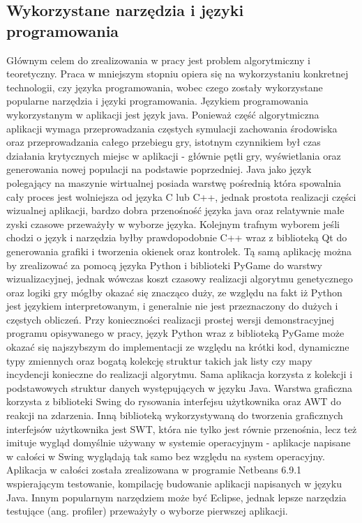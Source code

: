 \subsection{Wykorzystane narzędzia i języki programowania}
\begin{par}
	Głównym celem do zrealizowania w pracy jest problem algorytmiczny i teoretyczny.
Praca w mniejszym stopniu opiera się na wykorzystaniu konkretnej technologii, czy języka programowania, wobec czego zostały wykorzystane popularne narzędzia i języki programowania.
Językiem programowania wykorzystanym w aplikacji jest język java.
Ponieważ część algorytmiczna aplikacji wymaga przeprowadzania częstych symulacji zachowania środowiska oraz przeprowadzania całego przebiegu gry, istotnym czynnikiem był czas działania krytycznych miejsc w aplikacji - głównie pętli gry, wyświetlania oraz generowania nowej populacji na podstawie poprzedniej.
Java jako język polegający na maszynie wirtualnej posiada warstwę pośrednią która spowalnia cały proces jest wolniejsza od języka C lub C++,
jednak prostota realizacji części wizualnej aplikacji, bardzo dobra przenośność języka java oraz relatywnie małe zyski czasowe przeważyły w wyborze języka.
Kolejnym trafnym wyborem jeśli chodzi o język i narzędzia byłby prawdopodobnie C++ wraz z biblioteką Qt do generowania grafiki i tworzenia okienek oraz kontrolek.
Tą samą aplikację można by zrealizować za pomocą języka Python i biblioteki PyGame do warstwy wizualizacyjnej,
jednak wówczas koszt czasowy realizacji algorytmu genetycznego oraz logiki gry mógłby okazać się znacząco duży, ze względu na fakt iż Python jest językiem interpretowanym, i generalnie nie jest przeznaczony do dużych i częstych obliczeń.
Przy konieczności realizacji prostej wersji demonstracyjnej programu opisywanego w pracy, język Python wraz z biblioteką PyGame może okazać się najszybszym do implementacji ze względu na krótki kod, dynamiczne typy zmiennych oraz bogatą kolekcję struktur takich jak listy czy mapy incydencji konieczne do realizacji algorytmu.
Sama aplikacja korzysta z kolekcji i podstawowych struktur danych występujących w języku Java.
Warstwa graficzna korzysta z biblioteki Swing do rysowania interfejsu użytkownika oraz AWT do reakcji na zdarzenia.
Inną biblioteką wykorzystywaną do tworzenia graficznych interfejsów użytkownika jest SWT, która nie tylko jest równie przenośnia, lecz też imituje wygląd domyślnie używany w systemie operacyjnym - aplikacje napisane w całości w Swing wyglądają tak samo bez względu na system operacyjny.
Aplikacja w całości została zrealizowana w programie Netbeans 6.9.1 wspierającym testowanie, kompilację budowanie aplikacji napisanych w języku Java.
Innym popularnym narzędziem może być Eclipse, jednak lepsze narzędzia testujące (ang. profiler) przeważyły o wyborze pierwszej aplikacji.
\end{par}

